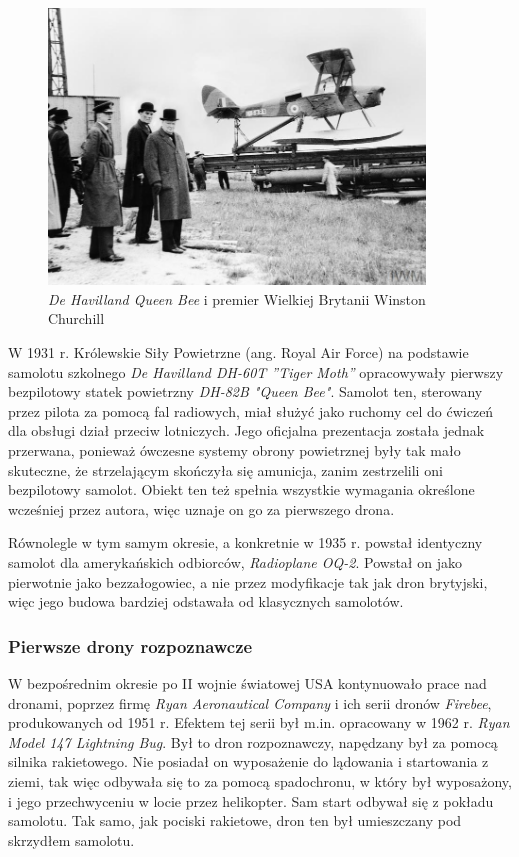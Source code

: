 \begin{figure}[ht!]
\begin{center}
  \includegraphics[width=10cm]{./Obrazy/queen-bee.jpg}
  \caption{\textit{De Havilland Queen Bee} i premier Wielkiej Brytanii Winston Churchill}
\end{center}
\end{figure}

W 1931 r. Królewskie Siły Powietrzne (ang. Royal Air Force) na podstawie samolotu szkolnego \textit{De Havilland DH-60T ”Tiger Moth”} opracowywały pierwszy bezpilotowy statek powietrzny \textit{DH-82B "Queen Bee"}.  Samolot ten, sterowany przez pilota za pomocą fal radiowych, miał służyć jako ruchomy cel do ćwiczeń dla obsługi dział przeciw lotniczych. Jego oficjalna prezentacja została jednak przerwana, ponieważ ówczesne systemy obrony powietrznej były tak mało skuteczne, że strzelającym skończyła się amunicja, zanim zestrzelili oni bezpilotowy samolot. Obiekt ten też spełnia wszystkie wymagania określone wcześniej przez autora, więc uznaje on go za pierwszego drona.

Równolegle w tym samym okresie, a konkretnie w 1935 r. powstał identyczny samolot dla amerykańskich odbiorców, \textit{Radioplane OQ-2}. Powstał on jako pierwotnie jako bezzałogowiec, a nie przez modyfikacje tak jak dron brytyjski, więc jego budowa bardziej odstawała od klasycznych samolotów.\cite{queen-bee}\cite{dron-ibuk}

\subsubsection{Pierwsze drony rozpoznawcze}
W bezpośrednim okresie po II wojnie światowej USA kontynuowało prace nad dronami, poprzez firmę \textit{Ryan Aeronautical Company} i ich serii dronów \textit{Firebee}, produkowanych od 1951 r. Efektem tej serii był m.in. opracowany w 1962 r. \textit{Ryan Model 147 Lightning Bug}. Był to dron rozpoznawczy, napędzany był za pomocą silnika rakietowego. Nie posiadał on wyposażenie do lądowania i startowania z ziemi, tak więc odbywała się to za pomocą spadochronu, w który był wyposażony, i jego przechwyceniu w locie przez helikopter. Sam start odbywał się z pokładu samolotu. Tak samo, jak pociski rakietowe, dron ten był umieszczany pod skrzydłem samolotu.

